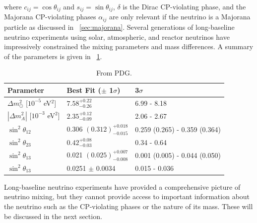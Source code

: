 where $c_{ij} = \cos{\theta_{ij}}$ and $s_{ij} = \sin{\theta_{ij}}$, $\delta$ is the Dirac CP-violating phase, and the Majorana CP-violating phases $\alpha_{ij}$ are only relevant if the neutrino is a Majorana particle as discussed in {\sect}~\ref{sec:majorana}.  Several generations of long-baseline neutrino experiments using solar, atmospheric, and reactor neutrinos have impressively constrained the mixing parameters and mass differences.  A summary of the parameters is given in {\tab}~\ref{tab:neutrinoParameters}.
\begin{table}
\centering
\begin{tabular}{lll}\toprule
Parameter & Best Fit ($\pm$ 1$\sigma$) & 3$\sigma$ \\
\midrule
${\Delta}m^2_{\odot}$ [$10^{-5}$ eV$^2$] & $7.58^{+0.22}_{-0.26}$ & 6.99 - 8.18 \\
$|{\Delta}m^2_A|$ [$10^{-3}$ eV$^2$] & $2.35^{+0.12}_{-0.09}$ & 2.06 - 2.67 \\
$\sin^2{\theta_{12}}$ & 0.306 $(0.312)^{+0.018}_{-0.015}$ & 0.259 (0.265) - 0.359 (0.364) \\  
$\sin^2{\theta_{23}}$ & $0.42^{+0.08}_{-0.03}$ & 0.34 - 0.64 \\  
$\sin^2{\theta_{13}}$ & 0.021 $(0.025)^{+0.007}_{-0.008}$ & 0.001 (0.005) - 0.044 (0.050) \\   
$\sin^2{\theta_{13}}$ & 0.0251 $\pm$ 0.0034 & 0.015 - 0.036 \\
\bottomrule  
\end{tabular}
\caption{From PDG.}
\label{tab:neutrinoParameters}
\end{table}
Long-baseline neutrino experiments have provided a comprehensive picture of neutrino mixing, but they cannot provide access to important information about the neutrino such as the CP-violating phases or the nature of its mass.  These will be discussed in the next section.


